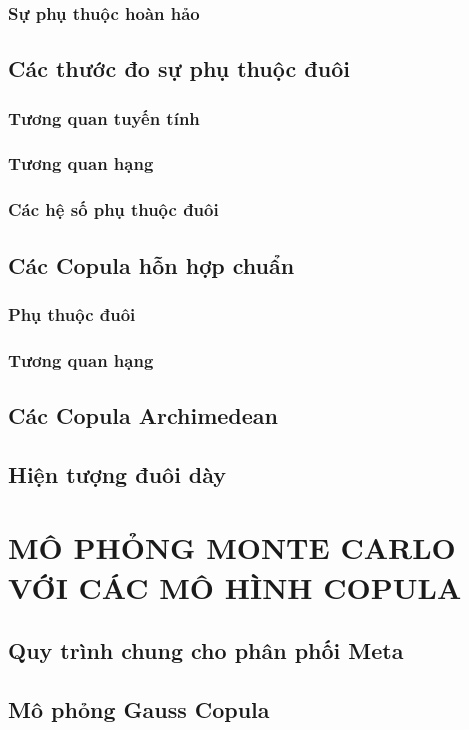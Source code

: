 \documentclass[a4paper,12pt]{article}
\begin{document}
\subsubsection{Sự phụ thuộc hoàn hảo}

\subsection{Các thước đo sự phụ thuộc đuôi}
\subsubsection{Tương quan tuyến tính}

\subsubsection{Tương quan hạng}

\subsubsection{Các hệ số phụ thuộc đuôi}

\subsection{Các Copula hỗn hợp chuẩn}
\subsubsection{Phụ thuộc đuôi}

\subsubsection{Tương quan hạng}

\subsection{Các Copula Archimedean}

\subsection{Hiện tượng đuôi dày}

\section{MÔ PHỎNG MONTE CARLO VỚI CÁC MÔ HÌNH COPULA}

\subsection{Quy trình chung cho phân phối Meta}

\subsection{Mô phỏng Gauss Copula}

\end{document}
